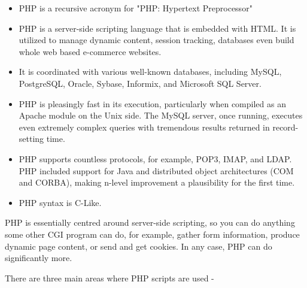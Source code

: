 \documentclass[../thesis.tex]{subfiles}
\begin{document}
\begin{itemize}
  \item PHP is a recursive acronym for "PHP: Hypertext Preprocessor"
  \item PHP is a server-side scripting language that is embedded with HTML. It is utilized to manage dynamic content, session tracking, databases even build whole web based e-commerce websites. 
  \item It is coordinated with various well-known databases, including MySQL, PostgreSQL, Oracle, Sybase, Informix, and Microsoft SQL Server. 
  \item PHP is pleasingly fast in its execution, particularly when compiled as an Apache module on the Unix side. The MySQL server, once running, executes even extremely complex queries with tremendous results returned in record-setting time. 
  \item PHP supports countless protocols, for example, POP3, IMAP, and LDAP. PHP included support for Java and distributed object architectures (COM and CORBA), making n-level improvement a plausibility for the first time. 
  \item PHP syntax is C-Like.  
\end{itemize}
    
PHP is essentially centred around server-side scripting, so you can do anything some other CGI program can do, for example, gather form information, produce dynamic page content, or send and get cookies. In any case, PHP can do significantly more.
\newline
    
There are three main areas where PHP scripts are used -
  
\end{document}
